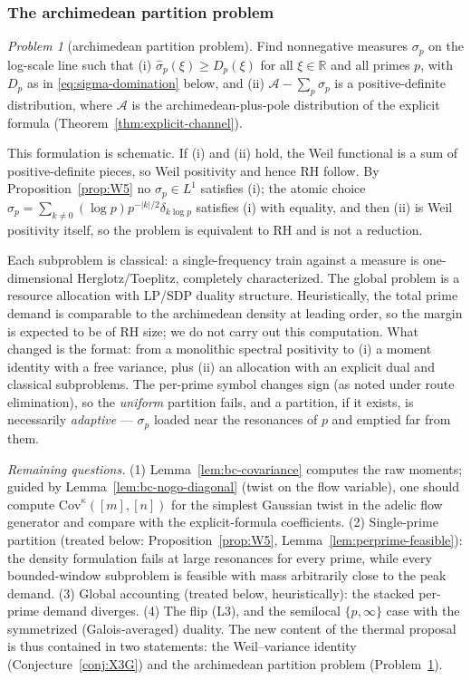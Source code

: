 \documentclass[11pt]{amsart}
\theoremstyle{definition}
\theoremstyle{remark}
\newtheorem{problem}[theorem]{Problem}
\theoremstyle{definition}
\newcommand{\R}{\mathbb{R}}
\begin{document}
\subsubsection*{The archimedean partition problem}

\begin{problem}[archimedean partition problem]\label{prob:arch-partition}
Find nonnegative measures $\sigma_p$ on the log-scale line such that \textnormal{(i)}
$\hat\sigma_p(\xi)\ge D_p(\xi)$ for all $\xi\in\R$ and all primes $p$, with $D_p$ as in
\eqref{eq:sigma-domination} below, and \textnormal{(ii)} $\mathcal A-\sum_p\sigma_p$ is a
positive-definite distribution, where $\mathcal A$ is the archimedean-plus-pole distribution of the
explicit formula (Theorem~\ref{thm:explicit-channel}).
\end{problem}

\noindent This formulation is schematic.  If \textnormal{(i)} and \textnormal{(ii)} hold, the Weil
functional is a sum of positive-definite pieces, so Weil positivity and hence \textnormal{RH} follow.
By Proposition~\ref{prop:W5} no $\sigma_p\in L^1$ satisfies \textnormal{(i)}; the atomic choice
$\sigma_p=\sum_{k\ne0}(\log p)p^{-|k|/2}\delta_{k\log p}$ satisfies \textnormal{(i)} with equality, and
then \textnormal{(ii)} is Weil positivity itself, so the problem is equivalent to RH and is not a
reduction.

Each subproblem is classical: a single-frequency train against a measure is one-dimensional
Herglotz/Toeplitz, completely characterized.  The global problem is a resource allocation with LP/SDP
duality structure.  Heuristically, the total prime demand is comparable to the archimedean density at
leading order, so the margin is expected to be of RH size; we do not carry out this computation.  What
changed is the format:
from a monolithic spectral positivity to (i) a moment identity with a free variance, plus (ii) an
allocation with an explicit dual and classical subproblems.  The per-prime symbol changes sign (as noted under route elimination),
so the \emph{uniform} partition fails, and a partition, if it exists, is necessarily \emph{adaptive}
--- $\sigma_p$ loaded near the resonances of $p$ and emptied far from them.

\emph{Remaining questions.}  (1) Lemma~\ref{lem:bc-covariance} computes the raw moments; guided by
Lemma~\ref{lem:bc-nogo-diagonal} (twist on the flow variable), one should
compute $\mathrm{Cov}^\kappa([m],[n])$ for the simplest Gaussian twist in the adelic flow generator and
compare with the explicit-formula coefficients.  (2) Single-prime partition (treated below:
Proposition~\ref{prop:W5}, Lemma~\ref{lem:perprime-feasible}): the density formulation fails at large
resonances for every prime, while every bounded-window subproblem is feasible with mass arbitrarily
close to the peak demand.  (3) Global accounting (treated below, heuristically): the stacked per-prime
demand diverges.  (4) The flip (L3), and the semilocal $\{p,\infty\}$ case with the symmetrized (Galois-averaged)
duality.  The new content of the thermal proposal is thus contained in two statements: the
Weil--variance identity (Conjecture~\ref{conj:X3G}) and the archimedean partition problem
(Problem~\ref{prob:arch-partition}).
\end{document}
